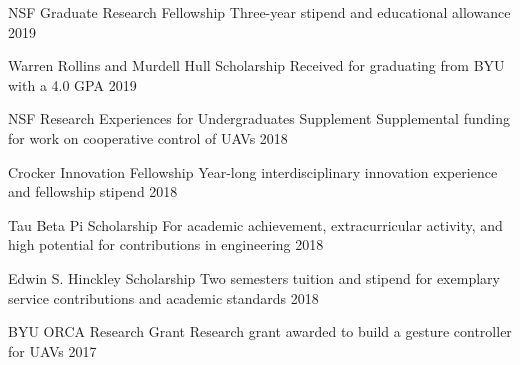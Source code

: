 
\begin{cvhonors}

  \cvhonor
    {NSF Graduate Research Fellowship} %
    {Three-year stipend and educational allowance} %
    {} %
    {2019} %
    
        
  \cvhonor
    {Warren Rollins and Murdell Hull Scholarship} %
    {Received for graduating from BYU with a 4.0 GPA} %
    {} %
    {2019} %
    
  \cvhonor
    {NSF Research Experiences for Undergraduates Supplement} %
    {Supplemental funding for work on cooperative control of UAVs} %
    {} %
    {2018} %
    
  \cvhonor
    {Crocker Innovation Fellowship} %
    {Year-long interdisciplinary innovation experience and fellowship stipend} %
    {} %
    {2018} %
    
  \cvhonor
    {Tau Beta Pi Scholarship} %
    {For academic achievement, extracurricular activity, and high potential for contributions in engineering} %
    {} %
    {2018} %
    
  \cvhonor
    {Edwin S. Hinckley Scholarship} %
    {Two semesters tuition and stipend for exemplary service contributions and academic standards} %
    {} %
    {2018} %
    
  \cvhonor
    {BYU ORCA Research Grant} %
    {Research grant awarded to build a gesture controller for UAVs} %
    {} %
    {2017} %
    

\end{cvhonors}
